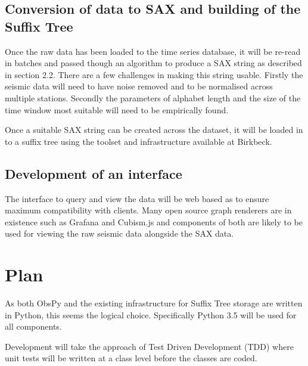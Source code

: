 \documentclass[11pt]{scrartcl}
\begin{document}
\subsection{Conversion of data to SAX and building of the Suffix Tree}
	Once the raw data has been loaded to the time series database, it will be re-read in batches and passed though an algorithm to produce a SAX string as described in section 2.2.  There are a few challenges in making this string usable.  Firstly the seismic data will need to have noise removed and to be normalised across multiple stations.  Secondly the parameters of alphabet length and the size of the time window most suitable will need to be empirically found.
	
	Once a suitable SAX string can be created across the dataset, it will be loaded in to a suffix tree using the toolset and infrastructure available at Birkbeck.

\subsection{Development of an interface}
	The interface to query and view the data will be web based as to ensure maximum compatibility with clients.  Many open source graph renderers are in existence such as Grafana and Cubism.js and components of both are likely to be used for viewing the raw seismic data alongside the SAX data.

\section{Plan}
	As both ObsPy and the existing infrastructure for Suffix Tree storage are written in Python, this seems the logical choice.  Specifically Python 3.5 will be used for all components.	
	
	Development will take the approach of Test Driven Development (TDD) where unit tests will be written at a class level before the classes are coded.


\end{document}
